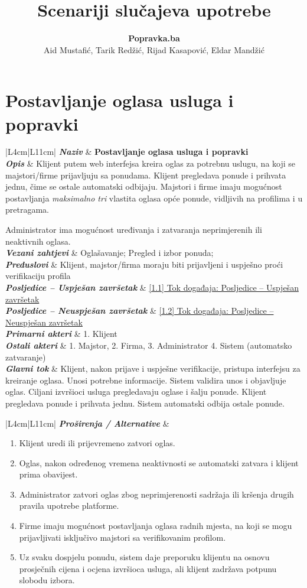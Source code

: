 \documentclass[12pt,a4paper]{article}
\title{\textbf{Scenariji slučajeva upotrebe}}
\author{\textbf{Popravka.ba}\\Aid Mustafić, Tarik Redžić, Rijad Kasapović, Eldar Mandžić}
\date{}
\newcommand{\usecase}[9]{%
\begin{longtable}{|L{4cm}|L{11cm}|}
\hline
\textbf{\textit{Naziv}} & \textbf{#1} \\
\hline
\textbf{\textit{Opis}} & #2 \\
\hline
\textbf{\textit{Vezani zahtjevi}} & #3 \\
\hline
\textbf{\textit{Preduslovi}} & #4 \\
\hline
\textbf{\textit{Posljedice -- Uspješan završetak}} & #5 \\
\hline
\textbf{\textit{Posljedice -- Neuspješan završetak}} & #6 \\
\hline
\textbf{\textit{Primarni akteri}} & #7 \\
\hline
\textbf{\textit{Ostali akteri}} & #8 \\
\hline
\textbf{\textit{Glavni tok}} & #9 \\
\hline
\end{longtable}%
}
\newcommand{\extensions}[1]{%
\vspace{-1.5em}
\begin{longtable}{|L{4cm}|L{11cm}|}
\hline
\textbf{\textit{Proširenja / Alternative}} & #1 \\
\hline
\end{longtable}%
}
\begin{document}
\maketitle
\thispagestyle{fancy}

\section{Postavljanje oglasa usluga i popravki}

\usecase
{Postavljanje oglasa usluga i popravki}
{Klijent putem web interfejsa kreira oglas za potrebnu uslugu,
    na koji se majstori/firme prijavljuju sa ponudama. Klijent pregledava ponude i prihvata jednu, čime se ostale automatski odbijaju.
    Majstori i firme imaju mogućnost postavljanja \emph{maksimalno tri} vlastita oglasa opće ponude, vidljivih na profilima i u pretragama.

    Administrator ima mogućnost uređivanja i zatvaranja neprimjerenih ili neaktivnih oglasa.
}
{ Oglašavanje; Pregled i izbor ponuda;}
{Klijent, majstor/firma moraju biti prijavljeni i uspješno proći verifikaciju profila}
{\hyperref[tok:1.1]{[1.1] Tok događaja: Posljedice -- Uspješan završetak}}
{\hyperref[tok:1.2]{[1.2] Tok događaja: Posljedice -- Neuspješan završetak}}
{1. Klijent}
{1. Majstor, 2. Firma, 3. Administrator 4. Sistem (automatsko zatvaranje)}
{Klijent, nakon prijave i uspješne verifikacije, pristupa interfejsu za kreiranje oglasa. Unosi potrebne informacije. Sistem validira unos i objavljuje oglas. Ciljani izvršioci usluga pregledavaju oglase i šalju ponude. Klijent pregledava ponude i prihvata jednu.
    Sistem automatski odbija ostale ponude.}


\extensions{
    \begin{enumerate}[nosep, leftmargin=*]
        \item Klijent uredi ili prijevremeno zatvori oglas.
        \item Oglas, nakon određenog vremena neaktivnosti se automatski zatvara i klijent prima obavijest.
        \item Administrator zatvori oglas zbog neprimjerenosti sadržaja ili kršenja drugih pravila upotrebe platforme.
        \item Firme imaju mogućnost postavljanja oglasa radnih mjesta, na koji se mogu prijavljivati isključivo majstori sa verifikovanim profilom.
        \item Uz svaku dospjelu ponudu, sistem daje preporuku klijentu na osnovu prosječnih cijena i ocjena izvršioca usluga, ali klijent zadržava potpunu slobodu izbora.
    \end{enumerate}}
\end{document}
